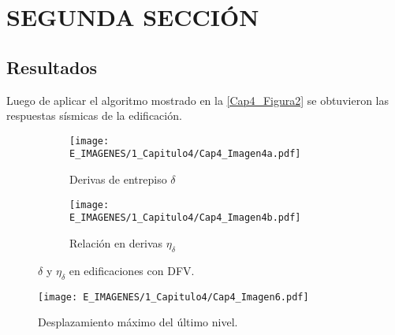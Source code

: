 \section{SEGUNDA SECCIÓN}

	\subsection{Resultados} \label{subsection:Resul_DFV}

Luego de aplicar el algoritmo mostrado en la \autoref{Cap4_Figura2} se obtuvieron las respuestas sísmicas de la edificación. 

\begin{figure}[!h]
     \centering
     \begin{subfigure}[b]{0.45\textwidth}
         \centering
         \texttt{[image: E\_IMAGENES/1\_Capitulo4/Cap4\_Imagen4a.pdf]}
         \caption{\raggedleft Derivas de entrepiso $\delta$ \hspace*{0.5cm}}
         \label{Cap4_Figura4a}
     \end{subfigure}
	\hspace{3mm}
     \begin{subfigure}[b]{0.45\textwidth}
         \centering
         \texttt{[image: E\_IMAGENES/1\_Capitulo4/Cap4\_Imagen4b.pdf]}
         \caption{\raggedleft Relación en derivas $\eta_{\delta}$ \hspace*{0.45cm}} 
         \label{Cap4_Figura4b}
     \end{subfigure}
        \caption[$\delta$ y $\eta_{\delta}$ en edificaciones con DFV]{\centering\footnotesize $\delta$ y $\eta_{\delta}$ en edificaciones con DFV.}
        \label{Cap4_Figura4}
     \vspace{5 mm}
	\end{figure}

	\begin{figure}[!h]
	\centering
		\texttt{[image: E\_IMAGENES/1\_Capitulo4/Cap4\_Imagen6.pdf]}
		\vspace{-3 mm}
	\caption[Desplazamiento máximo del último nivel]{\centering\footnotesize Desplazamiento máximo del último nivel.}
	\label{Cap4_Figura5}
	\end{figure}


